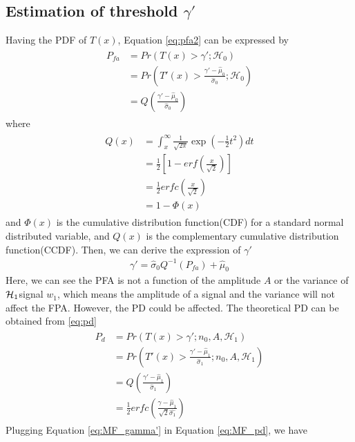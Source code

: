 \subsection{Estimation of threshold $\gamma'$}
Having the PDF of $T(x)$, Equation \eqref{eq:pfa2} can be expressed by
\begin{align} \label{eq:pfa_gamma}
\begin{split}
P_{fa}&=Pr(T(x)>\gamma';\mathcal{H}_0)\\
&=Pr(T'(x)>\frac{\gamma'-\hat{\mu}_0}{\hat{\sigma}_0};\mathcal{H}_0)\\
& = Q(\frac{\gamma'-\hat{\mu}_0}{\hat{\sigma}_0})
\end{split}
\end{align}
where 
\begin{align}
\begin{split}
Q(x) &=\int_x^\infty\frac{1}{\sqrt{2\pi}}\exp(-\frac{1}{2}t^2)dt\\
&=\frac{1}{2}[1-erf(\frac{x}{\sqrt{2}})]\\
&=\frac{1}{2}erfc(\frac{x}{\sqrt{2}})\\
&=1-\Phi(x)
\end{split}
\end{align}
and $\Phi(x)$ is the cumulative distribution function(CDF) for a standard normal distributed variable, and $Q(x)$ is the complementary cumulative distribution function(CCDF). Then, we can derive the expression of $\gamma'$
\begin{align} \label{eq:MF_gamma'}
\gamma'=\hat{\sigma}_0Q^{-1}(P_{fa})+\hat{\mu}_0    
\end{align}
Here, we can see the PFA is not a function of the amplitude $A$ or the variance of $\operatorname*{\mathcal{H}_1}$signal $w_1$, which means the amplitude of a signal and the variance will not affect the FPA. However, the PD could be affected. The theoretical PD can be obtained from \eqref{eq:pd}
\begin{align}
\begin{split} \label{eq:MF_pd}
P_d&=Pr(T(x)>\gamma';n_0,A, \mathcal{H}_1)\\
&  = Pr(T'(x)>\frac{\gamma'-\hat{\mu}_1}{\hat{\sigma}_1};n_0,A, \mathcal{H}_1)\\
& = Q(\frac{\gamma'-\hat{\mu}_1}{\hat{\sigma}_1})\\
&=\frac{1}{2}erfc(\frac{\gamma-\hat{\mu}_1}{\sqrt{2}\hat{\sigma_1}})
\end{split}
\end{align}
Plugging Equation \eqref{eq:MF_gamma'} in Equation \eqref{eq:MF_pd}, we have
